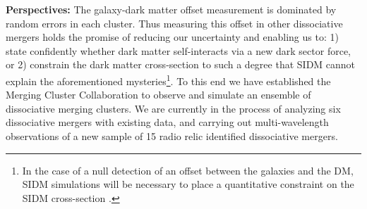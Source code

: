 \noindent\textbf{Perspectives:}
The galaxy-dark matter offset measurement is dominated by random errors in each cluster.
Thus measuring this offset in other dissociative mergers holds the promise of reducing our uncertainty and enabling us to: 1) state confidently whether dark matter self-interacts via a new dark sector force, or 2) constrain the dark matter cross-section to such a degree that SIDM cannot explain the aforementioned mysteries\footnote{In the case of a null detection of an offset between the galaxies and the DM, SIDM simulations will be necessary to place a quantitative constraint on the SIDM cross-section \citep[see e.g.,][]{Randall:2008hs}.}.
To this end we have established the Merging Cluster Collaboration to observe and simulate an ensemble of dissociative merging clusters.
We are currently in the process of analyzing six dissociative mergers with existing data, and carrying out multi-wavelength observations of a new sample of 15 radio relic identified dissociative mergers.